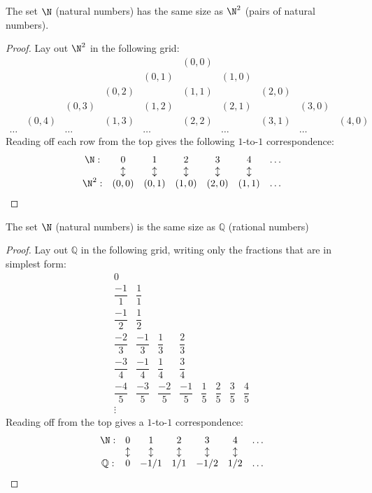 \documentclass{scrbook}
\newcommand{\Q}{\mathbb{Q}}
\begin{document}
\begin{theorem}
  The set $\N$ (natural numbers) has the same size as $\N^2$ (pairs of natural numbers). 
\end{theorem}
\begin{proof}
  Lay out $\N^2$ in the following grid: 
  \[
  \begin{matrix}
    &&&&& (0,0)&  \\
    &&&&(0,1)& & (1,0) \\
    &&&(0,2) && (1,1) && (2,0)  \\
    &&(0,3) && (1,2) && (2,1)&& (3,0) \\
    &(0,4) && (1,3) && (2,2) && (3,1) && (4,0) \\
    \dots && \dots && \dots && \dots && \dots  
  \end{matrix}
  \]
  Reading off each row from the top gives the following $1$-to-$1$ correspondence:
  \[
  \begin{matrix}
    \N:& 0 & 1 & 2 & 3 & 4 & \dots \\
       & \updownarrow & \updownarrow& \updownarrow&\updownarrow&\updownarrow & \\
    \N^2:& (0,0) & (0,1) & (1,0) & (2,0) & (1,1) & \dots 
  \end{matrix}
  \]
\end{proof}

\begin{theorem}
  The set $\N$ (natural numbers) is the same size as $\Q$ (rational numbers)
\end{theorem}
\begin{proof}
  Lay out $\Q$ in the following grid, writing only the fractions that are in simplest form: 
  \begingroup
  \renewcommand*{\arraystretch}{2.2}
  \[
  \begin{matrix}
    0 \\
    \dfrac{-1}{1} & \dfrac 11\\
    \dfrac{-1}{2} & \dfrac{1}{2}\\
    \dfrac{-2}{3} & \dfrac{-1}3 & \dfrac 1 3 & \dfrac 2 3 \\
    \dfrac{-3}4 & \dfrac{-1}4 & \dfrac 1 4 & \dfrac 3 4 \\
    \dfrac{-4}5 & \dfrac {-3}5 & \dfrac {-2}5 & \dfrac {-1}5 & \dfrac 15 &\dfrac 25& \dfrac 35& \dfrac 45 \\
    \vdots 
  \end{matrix}
  \]
  \endgroup
  Reading off from the top gives a $1$-to-$1$ correspondence: 
  \[
  \begin{matrix}
    \N:& 0 & 1 & 2 & 3 & 4 & \dots \\
       & \updownarrow & \updownarrow& \updownarrow&\updownarrow&\updownarrow & \\
    \Q:& 0 & -1/1 & 1/1 & -1/2& 1/2 & \dots 
  \end{matrix}
  \]
\end{proof}
\end{document}
